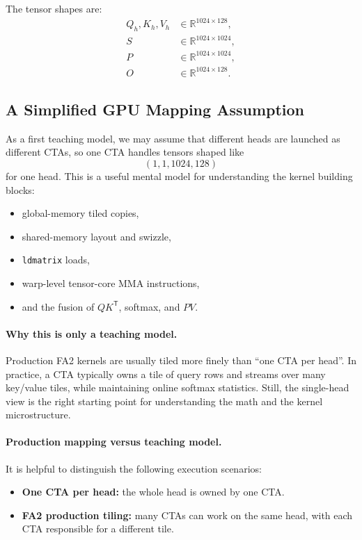 \documentclass[11pt]{article}
\newcommand{\R}{\mathbb{R}}
\newcommand{\trans}{\mathsf{T}}
\begin{document}
The tensor shapes are:
\begin{align}
Q_h, K_h, V_h &\in \R^{1024 \times 128}, \\
S &\in \R^{1024 \times 1024}, \\
P &\in \R^{1024 \times 1024}, \\
O &\in \R^{1024 \times 128}.
\end{align}


\subsection{A Simplified GPU Mapping Assumption}

As a first teaching model, we may assume that different heads are launched as
different CTAs, so one CTA handles tensors shaped like
\[
(1, 1, 1024, 128)
\]
for one head. This is a useful mental model for understanding the kernel
building blocks:

\begin{itemize}
    \item global-memory tiled copies,
    \item shared-memory layout and swizzle,
    \item \texttt{ldmatrix} loads,
    \item warp-level tensor-core MMA instructions,
    \item and the fusion of $QK^\trans$, softmax, and $PV$.
\end{itemize}

\paragraph{Why this is only a teaching model.}
Production FA2 kernels are usually tiled more finely than ``one CTA per head''.
In practice, a CTA typically owns a tile of query rows and streams over
many key/value tiles, while maintaining online softmax statistics. Still, the
single-head view is the right starting point for understanding the math and the
kernel microstructure.

\paragraph{Production mapping versus teaching model.}
It is helpful to distinguish the following execution scenarios:

\begin{itemize}
    \item \textbf{One CTA per head:} the whole head is owned by one CTA.
    \item \textbf{FA2 production tiling:} many CTAs can work on the same head,
    with each CTA responsible for a different tile.
\end{itemize}
\end{document}
